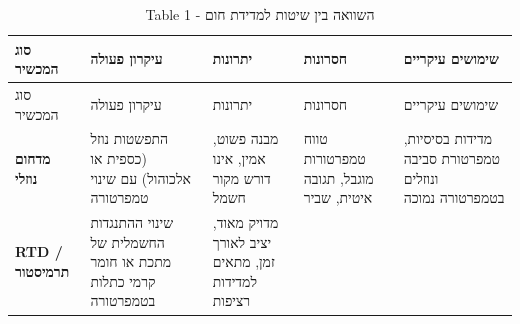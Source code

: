 \documentclass[
  hebrew,
  letterpaper,
  DIV=11,
  numbers=noendperiod]{scrreprt}
\begin{document}
\begin{longtable}[]{@{}
  >{\raggedright\arraybackslash}p{}
  >{\raggedright\arraybackslash}p{}
  >{\raggedright\arraybackslash}p{}
  >{\raggedright\arraybackslash}p{}
  >{\raggedright\arraybackslash}p{}@{}}
\caption{Table {1 - השוואה בין שיטות למדידת חום}}\tabularnewline
\toprule\noalign{}
\begin{minipage}[b]{\linewidth}\raggedright
סוג המכשיר
\end{minipage} & \begin{minipage}[b]{\linewidth}\raggedright
עיקרון פעולה
\end{minipage} & \begin{minipage}[b]{\linewidth}\raggedright
יתרונות
\end{minipage} & \begin{minipage}[b]{\linewidth}\raggedright
חסרונות
\end{minipage} & \begin{minipage}[b]{\linewidth}\raggedright
שימושים עיקריים
\end{minipage} \\
\midrule\noalign{}
\endfirsthead
\toprule\noalign{}
\begin{minipage}[b]{\linewidth}\raggedright
סוג המכשיר
\end{minipage} & \begin{minipage}[b]{\linewidth}\raggedright
עיקרון פעולה
\end{minipage} & \begin{minipage}[b]{\linewidth}\raggedright
יתרונות
\end{minipage} & \begin{minipage}[b]{\linewidth}\raggedright
חסרונות
\end{minipage} & \begin{minipage}[b]{\linewidth}\raggedright
שימושים עיקריים
\end{minipage} \\
\midrule\noalign{}
\endhead
\bottomrule\noalign{}
\endlastfoot
\textbf{מדחום נוזלי} & התפשטות נוזל (כספית או אלכוהול) עם שינוי טמפרטורה
& מבנה פשוט, אמין, אינו דורש מקור חשמל & טווח טמפרטורות מוגבל, תגובה
איטית, שביר & מדידות בסיסיות, טמפרטורת סביבה ונוזלים בטמפרטורה נמוכה \\
\textbf{RTD / תרמיסטור} & שינוי ההתנגדות החשמלית של מתכת או חומר קרמי
כתלות בטמפרטורה & מדויק מאוד, יציב לאורך זמן, מתאים למדידות רציפות &

\end{longtable}
\end{document}
